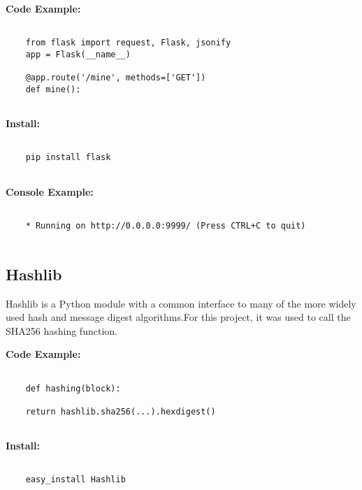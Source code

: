 \bigskip
\noindent
\textbf{Code Example:}
\begin{footnotesize}
\begin{verbatim}

    from flask import request, Flask, jsonify
   	app = Flask(__name__)

    @app.route('/mine', methods=['GET'])
    def mine():
    
\end{verbatim}
\end{footnotesize}
\noindent
\textbf{Install:}
\begin{footnotesize}
\begin{verbatim}

    pip install flask
    
\end{verbatim}
\end{footnotesize}
\noindent
\textbf{Console Example:}
\begin{footnotesize}
\begin{verbatim}

    * Running on http://0.0.0.0:9999/ (Press CTRL+C to quit)
    
\end{verbatim}
\end{footnotesize}
\subsection{Hashlib}

Hashlib is a Python module with a common interface to many of the more widely used hash and 
message digest algorithms.For this project, it was used to call the SHA256 hashing function.

\bigskip
\noindent
\textbf{Code Example:}
\begin{footnotesize}
\begin{verbatim}

    def hashing(block):

    return hashlib.sha256(...).hexdigest()
    
\end{verbatim}
\end{footnotesize}
\noindent
\textbf{Install:}
\begin{footnotesize}
\begin{verbatim}

    easy_install Hashlib
    
\end{verbatim}
\end{footnotesize}

